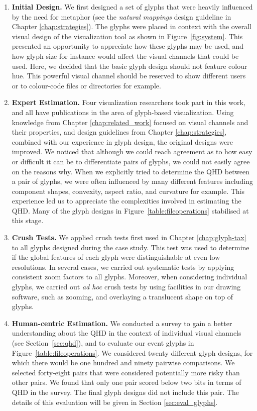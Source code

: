\begin{enumerate}
\item\textbf{Initial Design.} We first designed a set of glyphs that were heavily influenced by the need for metaphor (see the \emph{natural mappings} design guideline in Chapter \ref{chap:strategies}).
The glyphs were placed in context with the overall visual design of the visualization tool as shown in Figure~\ref{fig:system}.
This presented an opportunity to appreciate how these glyphs may be used, and how glyph size for instance would affect the visual channels that could be used.
Here, we decided that the basic glyph design should not feature colour hue. 
This powerful visual channel should be reserved to show different users or to colour-code files or directories for example.

\item\textbf{Expert Estimation.} Four visualization researchers took part in this work, and all have publications in the area of glyph-based visualization.
Using knowledge from Chapter \ref{chap:related_work} focused on visual channels and their properties, and design guidelines from Chapter \ref{chap:strategies}, combined with our experience in glyph design, the original designs were improved.
We noticed that although we could reach agreement as to how easy or difficult it can be to differentiate pairs of glyphs, we could not easily agree on the reasons why.
When we explicitly tried to determine the QHD between a pair of glyphs, we were often influenced by many different features including component shapes, convexity, aspect ratio, and curvature for example.
This experience led us to appreciate the complexities involved in estimating the QHD.
Many of the glyph designs in Figure~\ref{table:fileoperations} stabilised at this stage. 

\item\textbf{Crush Tests.} We applied crush tests first used in Chapter \ref{chap:glyph-tax} to all glyphs designed during the case study.
This test was used to determine if the global features of each glyph were distinguishable at even low resolutions.
In several cases, we carried out systematic tests by applying consistent zoom factors to all glyphs.
Moreover, when considering individual glyphs, we carried out \emph{ad hoc} crush tests by using facilities in our drawing software, such as zooming, and overlaying a translucent shape on top of glyphs.

\item\textbf{Human-centric Estimation.} We conducted a survey to gain a better understanding about the QHD in the context of individual visual channels (see Section~\ref{sec:qhd}), and to evaluate our event glyphs in Figure~\ref{table:fileoperations}.
We considered twenty different glyph designs, for which there would be one hundred and ninety pairwise comparisons.
We selected forty-eight pairs that were considered potentially more risky than other pairs.
We found that only one pair scored below two bits in terms of QHD in the survey.
The final glyph designs did not include this pair.
The details of this evaluation will be given in Section \ref{sec:eval_glyphs}.


\end{enumerate}
